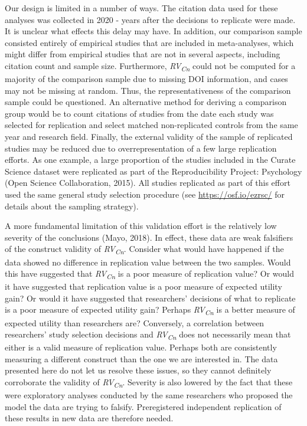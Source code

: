 \documentclass[
  english,
  jou,floatsintext]{apa6}
\begin{document}
Our design is limited in a number of ways. The citation data used for these analyses was collected in 2020 - years after the decisions to replicate were made. It is unclear what effects this delay may have. In addition, our comparison sample consisted entirely of empirical studies that are included in meta-analyses, which might differ from empirical studies that are not in several aspects, including citation count and sample size. Furthermore, \emph{RV\textsubscript{Cn}} could not be computed for a majority of the comparison sample due to missing DOI information, and cases may not be missing at random. Thus, the representativeness of the comparison sample could be questioned. An alternative method for deriving a comparison group would be to count citations of studies from the date each study was selected for replication and select matched non-replicated controls from the same year and research field. Finally, the external validity of the sample of replicated studies may be reduced due to overrepresentation of a few large replication efforts. As one example, a large proportion of the studies included in the Curate Science dataset were replicated as part of the Reproducibility Project: Psychology (Open Science Collaboration, 2015). All studies replicated as part of this effort used the same general study selection procedure (see \url{https://osf.io/ezrsc/} for details about the sampling strategy).

A more fundamental limitation of this validation effort is the relatively low severity of the conclusions (Mayo, 2018). In effect, these data are weak falsifiers of the construct validity of \emph{RV\textsubscript{Cn}}. Consider what would have happened if the data showed no difference in replication value between the two samples. Would this have suggested that \emph{RV\textsubscript{Cn}} is a poor measure of replication value? Or would it have suggested that replication value is a poor measure of expected utility gain? Or would it have suggested that researchers' decisions of what to replicate is a poor measure of expected utility gain? Perhaps \emph{RV\textsubscript{Cn}} is a better measure of expected utility than researchers are? Conversely, a correlation between researchers' study selection decisions and \emph{RV\textsubscript{Cn}} does not necessarily mean that either is a valid measure of replication value. Perhaps both are consistently measuring a different construct than the one we are interested in. The data presented here do not let us resolve these issues, so they cannot definitely corroborate the validity of \emph{RV\textsubscript{Cn}}. Severity is also lowered by the fact that these were exploratory analyses conducted by the same researchers who proposed the model the data are trying to falsify. Preregistered independent replication of these results in new data are therefore needed.
\end{document}
